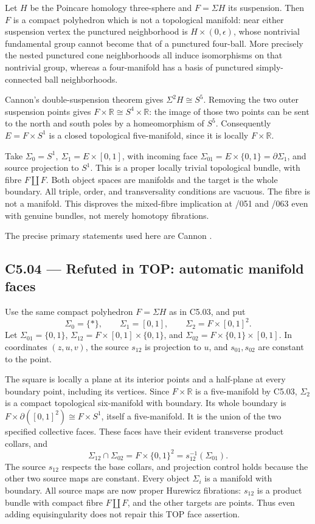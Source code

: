 Let \(H\) be the Poincare homology three-sphere and \(F=\Sigma H\) its suspension. Then \(F\) is a compact polyhedron which is not a topological manifold: near either suspension vertex the punctured neighborhood is \(H\times(0,\epsilon)\), whose nontrivial fundamental group cannot become that of a punctured four-ball. More precisely the nested punctured cone neighborhoods all induce isomorphisms on that nontrivial group, whereas a four-manifold has a basis of punctured simply-connected ball neighborhoods.

Cannon's double-suspension theorem gives \(\Sigma^2H\cong S^5\). Removing the two outer suspension points gives \(F\times\mathbb R\cong S^4\times\mathbb R\): the image of those two points can be sent to the north and south poles by a homeomorphism of \(S^5\). Consequently \(E=F\times S^1\) is a closed topological five-manifold, since it is locally \(F\times\mathbb R\).

Take \(\Sigma_0=S^1,\ \Sigma_1=E\times[0,1]\), with incoming face \(\Sigma_{01}=E\times\{0,1\}=\partial\Sigma_1\), and source projection to \(S^1\). This is a proper locally trivial topological bundle, with fibre \(F\amalg F\). Both object spaces are manifolds and the target is the whole boundary. All triple, order, and transversality conditions are vacuous. The fibre is not a manifold. This disproves the mixed-fibre implication at /051 and /063 even with genuine bundles, not merely homotopy fibrations.

The precise primary statements used here are Cannon \cite[Theorem 1.5, p.833; Corollary 3.6, p.838]{C_Cannon}.

\subsection{C5.04 --- Refuted in TOP: automatic manifold faces}\label{c5.04-refuted-in-top-automatic-manifold-faces}

Use the same compact polyhedron \(F=\Sigma H\) as in C5.03, and put \[
 \Sigma_0=\{*\},\qquad \Sigma_1=[0,1],\qquad
 \Sigma_2=F\times[0,1]^2.
\] Let \(\Sigma_{01}=\{0,1\}\), \(\Sigma_{12}=F\times[0,1]\times\{0,1\}\), and \(\Sigma_{02}=F\times\{0,1\}\times[0,1]\). In coordinates \((z,u,v)\), the source \(s_{12}\) is projection to \(u\), and \(s_{01},s_{02}\) are constant to the point.

The square is locally a plane at its interior points and a half-plane at every boundary point, including its vertices. Since \(F\times\mathbb R\) is a five-manifold by C5.03, \(\Sigma_2\) is a compact topological six-manifold with boundary. Its whole boundary is \(F\times\partial([0,1]^2)\cong F\times S^1\), itself a five-manifold. It is the union of the two specified collective faces. These faces have their evident transverse product collars, and \[
 \Sigma_{12}\cap\Sigma_{02}
 =F\times\{0,1\}^2=s_{12}^{-1}(\Sigma_{01}).
\] The source \(s_{12}\) respects the base collars, and projection control holds because the other two source maps are constant. Every object \(\Sigma_i\) is a manifold with boundary. All source maps are now proper Hurewicz fibrations: \(s_{12}\) is a product bundle with compact fibre \(F\amalg F\), and the other targets are points. Thus even adding equisingularity does not repair this TOP face assertion.

